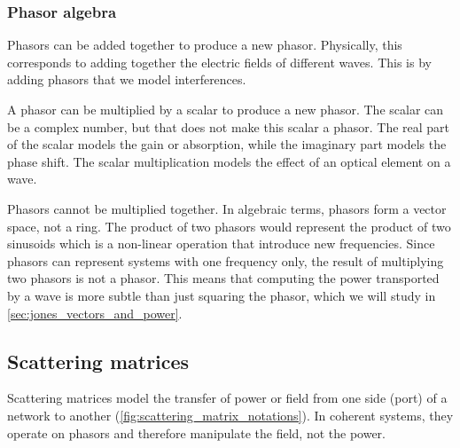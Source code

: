 \subsubsection{Phasor algebra}
Phasors can be added together to produce a new phasor.
Physically, this corresponds to adding together the electric fields of different waves.
This is by adding phasors that we model interferences.

A phasor can be multiplied by a scalar to produce a new phasor.
The scalar can be a complex number, but that does not make this scalar a phasor. 
The real part of the scalar models the gain or absorption, while the imaginary part models the phase shift.
The scalar multiplication models the effect of an optical element on a wave.

Phasors cannot be multiplied together.
In algebraic terms, phasors form a vector space, not a ring.
The product of two phasors would represent the product of two sinusoids which is a non-linear operation that introduce new frequencies.
Since phasors can represent systems with one frequency only, the result of multiplying two phasors is not a phasor.
This means that computing the power transported by a wave is more subtle than just squaring the phasor, which we will study in \vref{sec:jones_vectors_and_power}.


\subsection{Scattering matrices}
Scattering matrices \cite{siegman1986lasers} model the transfer of power or field from one side (port) of a network to another (\cref{fig:scattering_matrix_notations}).
In coherent systems, they operate on phasors and therefore manipulate the field, not the power.

